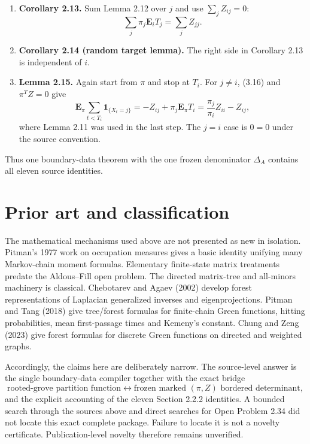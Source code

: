 \documentclass[11pt]{article}
\newcommand{\E}{\mathbf E}
\begin{document}
\begin{enumerate}
\item \textbf{Corollary 2.13.}  Sum Lemma 2.12 over $j$ and use $\sum_j Z_{ij}=0$:
\[
\sum_j\pi_j\E_iT_j=\sum_j Z_{jj}.
\]

\item \textbf{Corollary 2.14 (random target lemma).}  The right side in Corollary 2.13 is independent of $i$.

\item \textbf{Lemma 2.15.}  Again start from $\pi$ and stop at $T_i$.  For $j\ne i$, (3.16) and $\pi^TZ=0$ give
\[
\E_\pi\sum_{t<T_i}\mathbf1_{\{X_t=j\}}
=-Z_{ij}+\pi_j\E_\pi T_i
=\frac{\pi_j}{\pi_i}Z_{ii}-Z_{ij},
\]
where Lemma 2.11 was used in the last step.  The $j=i$ case is $0=0$ under the source convention.
\end{enumerate}
Thus one boundary-data theorem with the one frozen denominator $\Delta_A$ contains all eleven source identities.

\section{Prior art and classification}
The mathematical mechanisms used above are not presented as new in isolation.  Pitman's 1977 work on occupation measures gives a basic identity unifying many Markov-chain moment formulas.  Elementary finite-state matrix treatments predate the Aldous--Fill open problem.  The directed matrix-tree and all-minors machinery is classical.  Chebotarev and Agaev (2002) develop forest representations of Laplacian generalized inverses and eigenprojections.  Pitman and Tang (2018) give tree/forest formulas for finite-chain Green functions, hitting probabilities, mean first-passage times and Kemeny's constant.  Chung and Zeng (2023) give forest formulas for discrete Green functions on directed and weighted graphs.

Accordingly, the claims here are deliberately narrow.  The source-level answer is the single boundary-data compiler together with the exact bridge
\[
\text{rooted-grove partition function}
\longleftrightarrow
\text{frozen marked }(\pi,Z)\text{ bordered determinant},
\]
and the explicit accounting of the eleven Section 2.2.2 identities.  A bounded search through the sources above and direct searches for Open Problem 2.34 did not locate this exact complete package.  Failure to locate it is not a novelty certificate.  Publication-level novelty therefore remains unverified.
\end{document}
